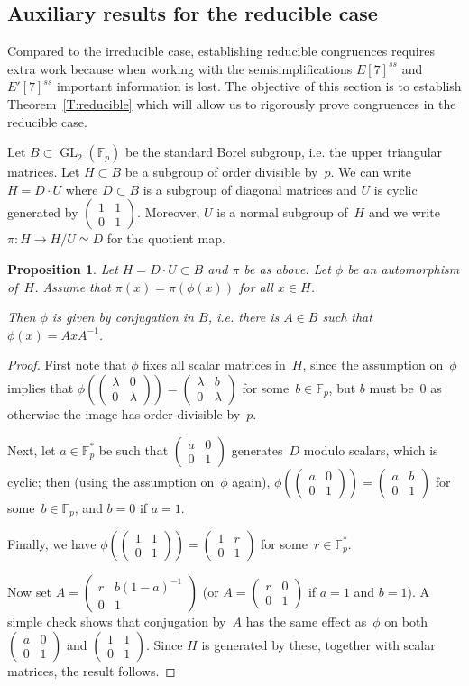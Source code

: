 \documentclass[12pt, reqno]{amsart}
\newcommand{\Fp}{\mathbb{F}_p}
\newcommand{\Fpstar}{\mathbb{F}_p^*}
\newcommand{\GL}{\operatorname{GL}}
\newcommand{\mat}[4]{{\left(\begin{smallmatrix} #1 & #2 \\ #3 & #4 \end{smallmatrix} \right)}}
\numberwithin{equation}{section}
\newtheorem{proposition}[theorem]{Proposition}
\theoremstyle{definition}
\theoremstyle{remark}
\begin{document}
\subsection{Auxiliary results for the reducible case}
Compared to the irreducible case, establishing reducible congruences
requires extra work because when working with the semisimplifications
$E[7]^{ss}$ and $E'[7]^{ss}$ important information is lost.  The
objective of this section is to establish Theorem~\ref{T:reducible}
which will allow us to rigorously prove congruences in the reducible
case.


Let $B \subset \GL_2(\Fp)$ be the standard Borel subgroup, i.e. the
upper triangular matrices. Let $H \subset B$ be a subgroup of order
divisible by~$p$.  We can write~$H = D\cdot U$ where $D \subset B$ is
a subgroup of diagonal matrices and $U$ is cyclic generated by
$\mat{1}{1}{0}{1}$.  Moreover, $U$ is a normal subgroup of~$H$ and we
write $\pi : H \to H/U \simeq D$ for the quotient map.

\begin{proposition} \label{P:inner}
Let $H = D \cdot U \subset B$ and $\pi$ be as above. 
Let $\phi$ be an automorphism of~$H$. Assume that  
$\pi(x) = \pi(\phi(x))$ for all $x \in H$. 

Then $\phi$ is given by conjugation in $B$, i.e. there is $A \in B$ such that $\phi(x) = AxA^{-1}$. 
\end{proposition}
\begin{proof}
First note that $\phi$ fixes all scalar matrices in~$H$, since the
assumption on~$\phi$ implies that $\phi(\mat{\lambda}{0}{0}{\lambda})
= \mat{\lambda}{b}{0}{\lambda}$ for some~$b\in\Fp$, but $b$ must
be~$0$ as otherwise the image has order divisible by~$p$.

Next, let $a\in\Fpstar$ be such that $\mat{a}{0}{0}{1}$ generates~$D$
modulo scalars, which is cyclic; then (using the assumption on~$\phi$
again), $\phi(\mat{a}{0}{0}{1}) = \mat{a}{b}{0}{1}$ for
some~$b\in\Fp$, and $b=0$ if $a=1$.

Finally, we have $\phi(\mat{1}{1}{0}{1}) = \mat{1}{r}{0}{1}$ for
some~$r\in\Fpstar$.

Now set $A=\mat{r}{b(1-a)^{-1}}{0}{1}$ (or $A=\mat{r}{0}{0}{1}$ if
$a=1$ and $b=1$).  A simple check shows that conjugation by~$A$ has
the same effect as~$\phi$ on both $\mat{a}{0}{0}{1}$ and
$\mat{1}{1}{0}{1}$.  Since $H$ is generated by these, together with
scalar matrices, the result follows.
\end{proof}
\end{document}
